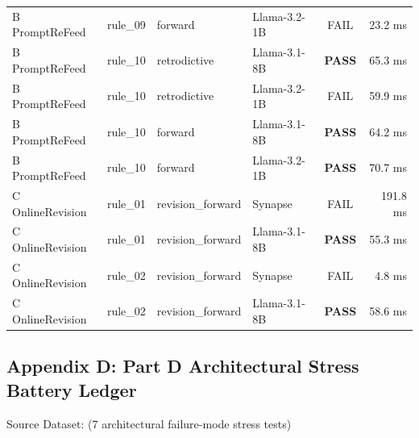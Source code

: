 {\begin{longtable}{p{2.2cm} p{1.2cm} p{2.0cm} p{3.8cm} c r}
B PromptReFeed & rule\_09 & forward & Llama-3.2-1B & \color{gray}FAIL & 23.2 ms \\
B PromptReFeed & rule\_10 & retrodictive & Llama-3.1-8B & \textbf{\color{passgreen}PASS} & 65.3 ms \\
B PromptReFeed & rule\_10 & retrodictive & Llama-3.2-1B & \color{gray}FAIL & 59.9 ms \\
B PromptReFeed & rule\_10 & forward & Llama-3.1-8B & \textbf{\color{passgreen}PASS} & 64.2 ms \\
B PromptReFeed & rule\_10 & forward & Llama-3.2-1B & \textbf{\color{passgreen}PASS} & 70.7 ms \\
C OnlineRevision & rule\_01 & revision\_forward & Synapse & \color{gray}FAIL & 191.8 ms \\
C OnlineRevision & rule\_01 & revision\_forward & Llama-3.1-8B & \textbf{\color{passgreen}PASS} & 55.3 ms \\
C OnlineRevision & rule\_02 & revision\_forward & Synapse & \color{gray}FAIL & 4.8 ms \\
C OnlineRevision & rule\_02 & revision\_forward & Llama-3.1-8B & \textbf{\color{passgreen}PASS} & 58.6 ms \\
\end{longtable}
\vspace{-0.5em}
}

\vspace{0.8em}
\subsection*{Appendix D: Part D Architectural Stress Battery Ledger}
\noindent\textsf{\footnotesize Source Dataset:  (7 architectural failure-mode stress tests)}
\vspace{0.2em}

